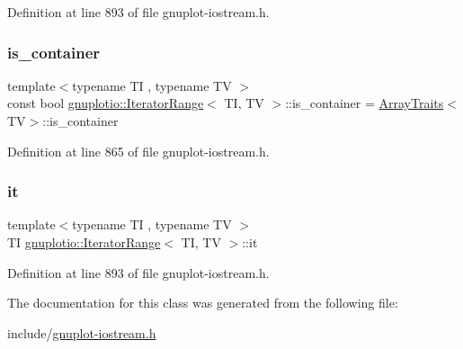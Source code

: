 Definition at line 893 of file gnuplot-\/iostream.\+h.

\mbox{\label{classgnuplotio_1_1_iterator_range_a3f79d84bdf18761b6e49ae54d050f8ff}} 
\subsubsection{\texorpdfstring{is\+\_\+container}{is\_container}}
{\footnotesize\ttfamily template$<$typename TI , typename TV $>$ \\
const bool \hyperlink{classgnuplotio_1_1_iterator_range}{gnuplotio\+::\+Iterator\+Range}$<$ TI, TV $>$\+::is\+\_\+container = \hyperlink{classgnuplotio_1_1_array_traits}{Array\+Traits}$<$TV$>$\+::is\+\_\+container\hspace{0.3cm}{\ttfamily [static]}}



Definition at line 865 of file gnuplot-\/iostream.\+h.

\mbox{\label{classgnuplotio_1_1_iterator_range_a0690732cf3ceea8c906cef20795686af}} 
\subsubsection{\texorpdfstring{it}{it}}
{\footnotesize\ttfamily template$<$typename TI , typename TV $>$ \\
TI \hyperlink{classgnuplotio_1_1_iterator_range}{gnuplotio\+::\+Iterator\+Range}$<$ TI, TV $>$\+::it\hspace{0.3cm}{\ttfamily [private]}}



Definition at line 893 of file gnuplot-\/iostream.\+h.



The documentation for this class was generated from the following file\+:\begin{DoxyCompactItemize}
\item 
include/\hyperlink{gnuplot-iostream_8h}{gnuplot-\/iostream.\+h}\end{DoxyCompactItemize}
